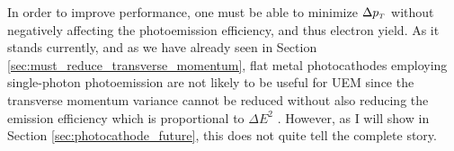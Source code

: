 In order to improve performance, one must be able to minimize $\Delta p_{{\scriptscriptstyle T}}$ without negatively affecting the photoemission efficiency, and thus electron yield.
As it stands currently, and as we have already seen in Section \ref{sec:must_reduce_transverse_momentum}, flat metal photocathodes employing single-photon photoemission are not likely to be useful for UEM since the transverse momentum variance cannot be reduced without also reducing the emission efficiency which is proportional to $\Delta E^2$ \cite{shalaev_electron_1994}.
However, as I will show in Section \ref{sec:photocathode_future}, this does not quite tell the complete story.

